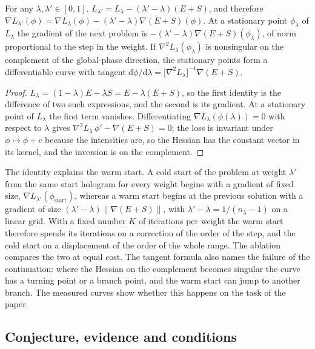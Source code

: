 \begin{proposition}\label{prop:warm}
For any $\lambda,\lambda'\in[0,1]$, $L_{\lambda'}=L_\lambda-(\lambda'-\lambda)(E+S)$, and therefore $\nabla L_{\lambda'}(\phi)=\nabla L_\lambda(\phi)-(\lambda'-\lambda)\nabla(E+S)(\phi)$. At a stationary point $\phi_\lambda$ of $L_\lambda$ the gradient of the next problem is $-(\lambda'-\lambda)\nabla(E+S)(\phi_\lambda)$, of norm proportional to the step in the weight.
If $\nabla^2L_\lambda(\phi_\lambda)$ is nonsingular on the complement of the global-phase direction, the stationary points form a differentiable curve with tangent $\mathrm{d}\phi/\mathrm{d}\lambda=\big[\nabla^2L_\lambda\big]^{-1}\nabla(E+S)$.
\end{proposition}
\begin{proof}
$L_\lambda=(1-\lambda)E-\lambda S=E-\lambda(E+S)$, so the first identity is the difference of two such expressions, and the second is its gradient. At a stationary point of $L_\lambda$ the first term vanishes. Differentiating $\nabla L_\lambda(\phi(\lambda))=0$ with respect to $\lambda$ gives $\nabla^2L_\lambda\,\phi'-\nabla(E+S)=0$; the loss is invariant under $\phi\mapsto\phi+c$ because the intensities are, so the Hessian has the constant vector in its kernel, and the inversion is on the complement.
\end{proof}

The identity explains the warm start. A cold start of the problem at weight $\lambda'$ from the same start hologram for every weight begins with a gradient of fixed size, $\nabla L_{\lambda'}(\phi_{\mathrm{start}})$, whereas a warm start begins at the previous solution with a gradient of size $(\lambda'-\lambda)\|\nabla(E+S)\|$, with $\lambda'-\lambda=1/(n_\lambda-1)$ on a linear grid. With a fixed number $K$ of
iterations per weight the warm start therefore spends its iterations on a correction of the order of the step, and the cold start on a displacement of the order of the whole range. The ablation compares the two at equal cost. The tangent formula also names the failure of the continuation: where the Hessian on the complement becomes singular the curve has a turning point or a branch point,
and the warm start can jump to another branch. The measured curves show whether this happens on the task of the paper.

\subsection{Conjecture, evidence and conditions}

